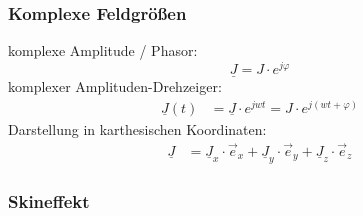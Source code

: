\subsubsection{Komplexe Feldgrößen}
\textbullet komplexe Amplitude / Phasor:
\begin{equation*}
	\underline{J}=J\cdot e^{j\varphi}
\end{equation*}
\textbullet komplexer Amplituden-Drehzeiger:
\begin{align*}
\underline{J}(t)&=\underline{J} \cdot e ^{jwt} = J \cdot e^{j(wt+\varphi)}
\end{align*}
\textbullet Darstellung in karthesischen Koordinaten:
\begin{align*}
	\underline{J}&=\underline{J}_x \cdot \vec{e}_x + \underline{J}_y \cdot \vec{e}_y + \underline{J}_z \cdot \vec{e}_z
\end{align*}

\subsubsection{Skineffekt}




